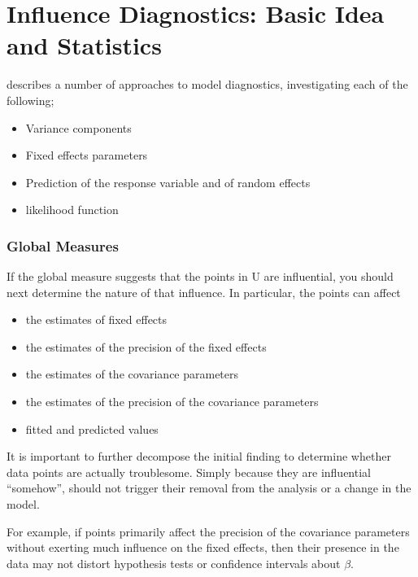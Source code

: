 \documentclass[12pt, a4paper]{report}
\theoremstyle{plain}
\theoremstyle{definition}
\theoremstyle{remark}
\begin{document}
\section{Influence Diagnostics: Basic Idea and Statistics} %

\citet{Zewotir} describes a number of approaches to model diagnostics, investigating each of the following;
\begin{itemize}
	\item Variance components
	\item Fixed effects parameters
	\item Prediction of the response variable and of random effects
	\item likelihood function
\end{itemize}


\subsubsection{Global Measures}
If the global measure suggests that the points in U are influential, you should next determine the nature of
that influence. In particular, the points can affect
\begin{itemize}
	\item the estimates of fixed effects
	\item the estimates of the precision of the fixed effects
	\item the estimates of the covariance parameters
	\item the estimates of the precision of the covariance parameters
	\item fitted and predicted values
\end{itemize}

It is important to further decompose the initial finding to determine whether data points are actually troublesome. Simply because they are influential “somehow”, should not trigger their removal from the analysis or a change in the model. 


For example, if points primarily affect the precision of the covariance parameters without exerting much influence on the fixed effects, then their presence in the data may not distort hypothesis
tests or confidence intervals about $\beta$.
\end{document}

